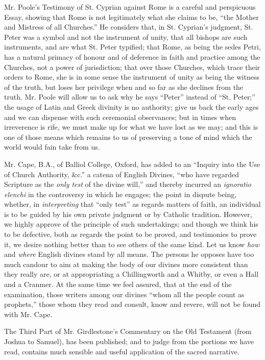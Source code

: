 Mr. Poole's Testimony of St. Cyprian against Rome
is a careful and perspicuous Essay, showing that Rome is not
legitimately what she claims to be, ``the Mother and Mistress of
all Churches.'' He considers that, in St. Cyprian's judgment, St. Peter
was a symbol and not the instrument of unity, that all bishops are such
instruments, and are what St. Peter typified; that Rome, as being the
sedes Petri, has a natural primacy of honour and of deference in faith
and practice among the Churches, not a power of jurisdiction; that over
those Churches, which trace their orders to Rome, she is in some sense
the instrument of unity as being the witness of the truth, but loses her
privilege when and so far as she declines from the truth. Mr. Poole will
allow us to ask why he says ``Peter'' instead of ``St. Peter;'' the usage of
Latin and Greek divinity is no authority; give us back the early ages
and we can dispense with such ceremonial observances; but in times when
irreverence is rife, we must make up for what we have lost as we may;
and this is one of those means which remains to us of preserving a tone
of mind which the world would fain take from us.

Mr. Cape, B.A., of Balliol College, Oxford, has
added to an ``Inquiry into the Use of Church Authority, \&c.'' a catena
of English Divines, ``who have regarded Scripture as the \emph{only test}
of the divine will,'' and thereby incurred an \emph{ignoratio elenchi} in
the controversy in which he engages; the point in dispute being,
whether, in \emph{interpreting} that ``only test'' as regards matters of
faith, an individual is to be guided by his own private judgment or by
Catholic tradition. However, we highly approve of the principle of such
undertakings; and though we think his to be defective, both as regards
the point to be proved, and testimonies to prove it, we desire nothing
better than to see others of the same kind. Let us know \emph{how} and \emph{where}
English divines stand by all means. The persons he opposes have too much
candour to aim at making the body of our divines more consistent than
they really are, or at appropriating a Chillingworth and a Whitby, or
even a Hall and a Cranmer. At the same time we feel assured, that at the
end of the examination, those writers among our divines ``whom all the
people count as prophets,'' those whom they read and consult, know and
revere, will not be found with Mr. Cape.

The Third Part of Mr. Girdlestone's Commentary on
the Old Testament (from Joshua to Samuel), has been published; and to
judge from the portions we have read, contains much sensible and useful
application of the sacred narrative.

